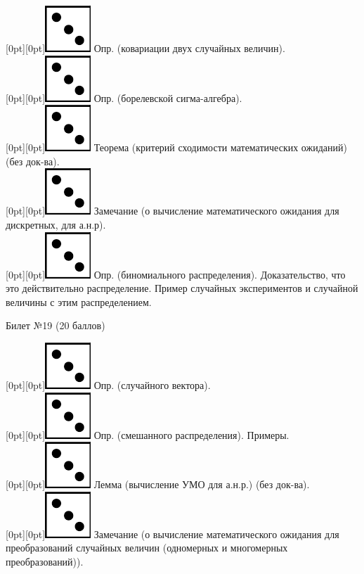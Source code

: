 \documentclass[10pt]{article}
\begin{document}
\raisebox{-1pt}[0pt][0pt]{\includegraphics[width=0.02\linewidth]{3.png}} Опр. (ковариации двух случайных величин). \\
\raisebox{-1pt}[0pt][0pt]{\includegraphics[width=0.02\linewidth]{3.png}} Опр. (борелевской сигма-алгебра). \\
\raisebox{-1pt}[0pt][0pt]{\includegraphics[width=0.02\linewidth]{3.png}} Теорема (критерий сходимости математических ожиданий) (без док-ва). \\
\raisebox{-1pt}[0pt][0pt]{\includegraphics[width=0.02\linewidth]{3.png}} Замечание (о вычисление  математического ожидания для дискретных, для а.н.р). \\
\raisebox{-1pt}[0pt][0pt]{\includegraphics[width=0.02\linewidth]{3.png}}  Опр. (биномиального распределения). Доказательство, что это действительно распределение. Пример случайных экспериментов и случайной величины с этим распределением. \\     
\begin{center} {\Large Билет №19 (20 баллов)} \end{center}
\raisebox{-1pt}[0pt][0pt]{\includegraphics[width=0.02\linewidth]{3.png}} Опр. (случайного вектора). \\
\raisebox{-1pt}[0pt][0pt]{\includegraphics[width=0.02\linewidth]{3.png}} Опр. (смешанного распределения). Примеры. \\
\raisebox{-1pt}[0pt][0pt]{\includegraphics[width=0.02\linewidth]{3.png}} Лемма (вычисление УМО для а.н.р.)  (без док-ва). \\
\raisebox{-1pt}[0pt][0pt]{\includegraphics[width=0.02\linewidth]{3.png}} Замечание (о вычисление  математического ожидания для преобразований случайных величин (одномерных и многомерных преобразований)). \\
\end{document}

